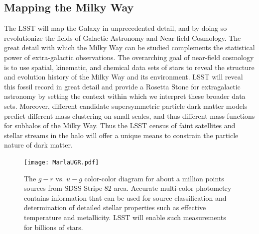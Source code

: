 \begin{itemize}
\end{itemize}


\subsection{Mapping the Milky Way }

The LSST will map the Galaxy in unprecedented detail, and by doing so revolutionize the fields of Galactic 
Astronomy and Near-field Cosmology. The great detail with which the Milky Way can be studied complements 
the statistical power of extra-galactic observations.  The overarching goal of near-field cosmology is to use 
spatial, kinematic, and chemical data sets of stars to reveal the structure and evolution history of the Milky Way
and its environment. LSST will reveal this fossil record in great detail and provide a Rosetta Stone for extragalactic 
astronomy by setting the context within which we interpret these
broader data sets. Moreover, different candidate supersymmetric
particle dark matter models predict different mass clustering on small
scales, and thus different mass functions for subhalos of the Milky
Way.  Thus the LSST census of faint satellites and stellar streams in
the halo will offer a unique means to constrain the 
particle nature of dark matter.  


\begin{figure}
\texttt{[image: MarlaUGR.pdf]}
\caption{The $g-r$ vs. $u-g$ color-color diagram for about a million points sources 
from SDSS Stripe 82 area. Accurate multi-color photometry 
contains information that can be used for source classification and determination of 
detailed stellar properties such as effective temperature and metallicity. LSST will 
enable such measurements for billions of stars.} 
\label{Fig:FeH}
\end{figure}


